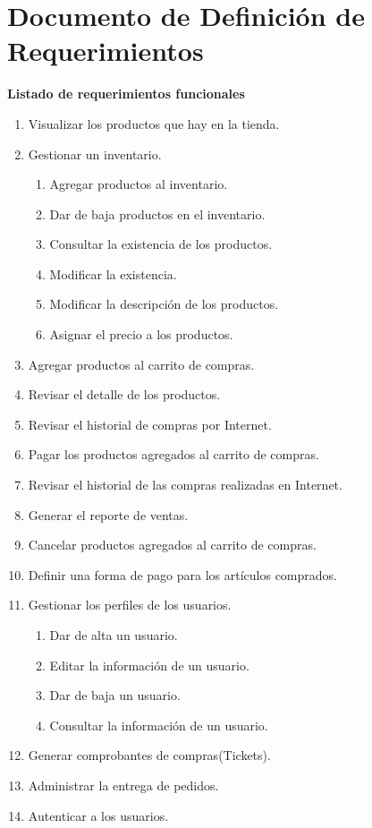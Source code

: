 \chapter{Documento de Definición de Requerimientos}

\textbf{Listado de requerimientos funcionales}

\begin{enumerate}
	\item Visualizar los productos que hay en la tienda.
	\item Gestionar un inventario.
		\begin{enumerate}
			\item Agregar productos al inventario.
			\item Dar de baja productos en el inventario.
			\item Consultar la existencia de los productos.
			\item Modificar la existencia.
			\item Modificar la descripción de los productos.
			\item Asignar el precio a los productos.
		\end{enumerate}
	\item Agregar productos al carrito de compras.
	\item Revisar el detalle de los productos.
	\item Revisar el historial de compras por Internet.
	\item Pagar los productos agregados al carrito de compras.
	\item Revisar el historial de las compras realizadas en Internet.
	\item Generar el reporte de ventas.
	\item Cancelar productos agregados al carrito de compras.
	\item Definir una forma de pago para los artículos comprados.
	\item Gestionar los perfiles de los usuarios.
		\begin{enumerate}
			\item Dar de alta un usuario.
			\item Editar la información de un usuario.
			\item Dar de baja un usuario.
			\item Consultar la información de un usuario.
		\end{enumerate}
	\item Generar comprobantes de compras(Tickets).
	\item Administrar la entrega de pedidos.
	\item Autenticar a los usuarios.
\end{enumerate}